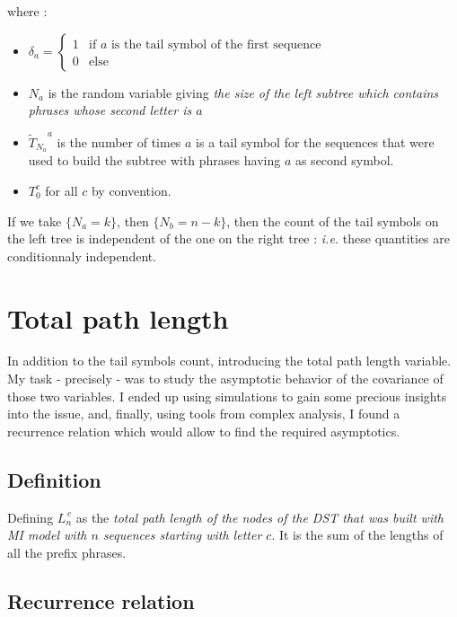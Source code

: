 where :
\begin{itemize}
  \item $\delta_a = 
            \begin{cases} 
                1 & \text{if $a$ is the tail symbol of the
                          first sequence}\\
                0 & \text{else} 
              \end{cases}$

  \item $N_a$ is the 
random variable giving \emph{the size of the left subtree 
which contains phrases whose second letter is $a$}

  \item ${{\tilde T}_{N_a}}^a$ is the number of 
times $a$ is a tail symbol for the sequences that were 
used to  build the subtree with phrases having $a$ as second
symbol.

  \item $T_0^c$ for all $c$ by convention.
\end{itemize}

If we take
$\{ N_a = k \}$, then $\{ N_b = n - k \}$, then
the count of the tail symbols on the left tree 
is independent of the one on the right tree :
\textit{i.e.} these quantities are conditionnaly independent.

\section{Total path length }

In addition to the tail symbols count, introducing the
total path length variable. My task - precisely - was 
to study the asymptotic behavior of the covariance of those 
two variables. I ended up using simulations to gain some precious
insights into the issue, and, finally, using tools from complex
analysis, I found a recurrence relation which would allow 
to find the required asymptotics.

\subsection{Definition }

Defining \emph{\bfseries $L_n^{\,c}$} as the \emph{total 
path length of the nodes of the DST that was built with
MI model with $n$ sequences starting with letter $c$}.
It is the sum of the lengths of all the prefix phrases.

\subsection{Recurrence relation }

